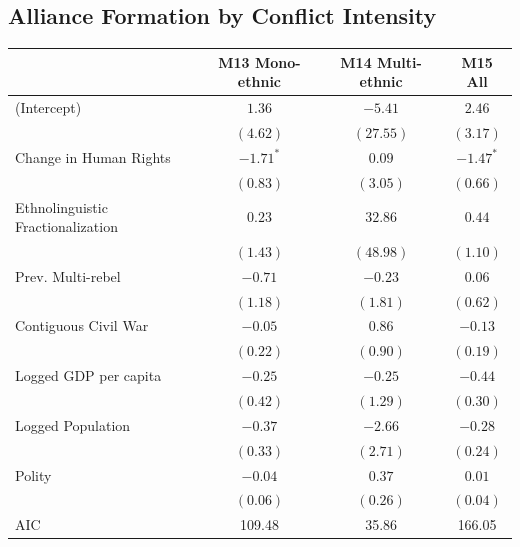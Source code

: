 \documentclass[12pt,]{book}
\let\origtable\table
\let\endorigtable\endtable
\renewenvironment{table}[1][2] {
    \singlespacing
    \expandafter\origtable\expandafter[H]
} {
    \endorigtable
}
\theoremstyle{definition}
\theoremstyle{definition}
\theoremstyle{definition}
\theoremstyle{remark}
\begin{document}
\hypertarget{alliance-formation-by-conflict-intensity}{%
\subsection*{Alliance Formation by Conflict
Intensity}\label{alliance-formation-by-conflict-intensity}}

\begin{table}
\begin{center}
\begin{tabular}{l c c c }
\hline
 & M13 Mono-ethnic & M14 Multi-ethnic & M15 All \\
\hline
(Intercept)                       & $1.36$      & $-5.41$   & $2.46$      \\
                                  & $(4.62)$    & $(27.55)$ & $(3.17)$    \\
Change in Human Rights            & $-1.71^{*}$ & $0.09$    & $-1.47^{*}$ \\
                                  & $(0.83)$    & $(3.05)$  & $(0.66)$    \\
Ethnolinguistic Fractionalization & $0.23$      & $32.86$   & $0.44$      \\
                                  & $(1.43)$    & $(48.98)$ & $(1.10)$    \\
Prev. Multi-rebel                 & $-0.71$     & $-0.23$   & $0.06$      \\
                                  & $(1.18)$    & $(1.81)$  & $(0.62)$    \\
Contiguous Civil War              & $-0.05$     & $0.86$    & $-0.13$     \\
                                  & $(0.22)$    & $(0.90)$  & $(0.19)$    \\
Logged GDP per capita             & $-0.25$     & $-0.25$   & $-0.44$     \\
                                  & $(0.42)$    & $(1.29)$  & $(0.30)$    \\
Logged Population                 & $-0.37$     & $-2.66$   & $-0.28$     \\
                                  & $(0.33)$    & $(2.71)$  & $(0.24)$    \\
Polity                            & $-0.04$     & $0.37$    & $0.01$      \\
                                  & $(0.06)$    & $(0.26)$  & $(0.04)$    \\
\hline
AIC                               & 109.48      & 35.86     & 166.05      \\

\end{tabular}
\end{center}
\end{table}
\end{document}
